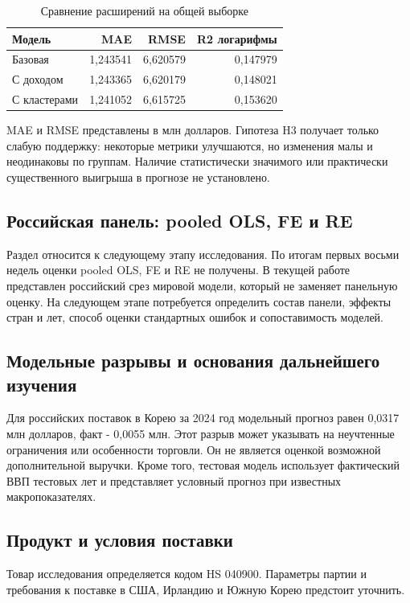 \documentclass[12pt,a4paper]{article}
\begin{document}
\begin{table}[H]
\centering
\caption{Сравнение расширений на общей выборке}\label{tab:model_ext}
{\small
\begin{tabular}{lrrr}
\toprule
Модель & MAE & RMSE & R2 логарифмы \\ \midrule
Базовая & 1,243541 & 6,620579 & 0,147979 \\
С доходом & 1,243365 & 6,620179 & 0,148021 \\
С кластерами & 1,241052 & 6,615725 & 0,153620 \\
\bottomrule
\end{tabular}}
\par{}
\end{table}
MAE и RMSE представлены в млн долларов. Гипотеза H3 получает только слабую поддержку: некоторые метрики улучшаются, но изменения малы и неодинаковы по группам. Наличие статистически значимого или практически существенного выигрыша в прогнозе не установлено.

\subsection{Российская панель: pooled OLS, FE и RE}
Раздел относится к следующему этапу исследования. По итогам первых восьми недель оценки pooled OLS, FE и RE не получены. В текущей работе представлен российский срез мировой модели, который не заменяет панельную оценку. На следующем этапе потребуется определить состав панели, эффекты стран и лет, способ оценки стандартных ошибок и сопоставимость моделей.

\subsection{Модельные разрывы и основания дальнейшего изучения}
Для российских поставок в Корею за 2024 год модельный прогноз равен 0,0317 млн долларов, факт - 0,0055 млн. Этот разрыв может указывать на неучтенные ограничения или особенности торговли. Он не является оценкой возможной дополнительной выручки. Кроме того, тестовая модель использует фактический ВВП тестовых лет и представляет условный прогноз при известных макропоказателях.

\subsection{Продукт и условия поставки}
Товар исследования определяется кодом HS 040900. Параметры партии и требования к поставке в США, Ирландию и Южную Корею предстоит уточнить.
\end{document}

